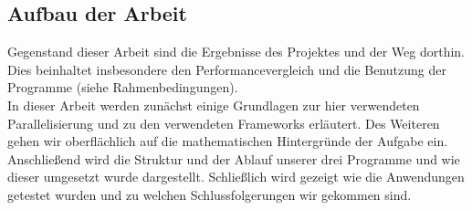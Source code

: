 \subsection{Aufbau der Arbeit}
Gegenstand dieser Arbeit sind die Ergebnisse des Projektes und der Weg dorthin. Dies beinhaltet insbesondere den Performancevergleich und die Benutzung der Programme (siehe Rahmenbedingungen).\\
In dieser Arbeit werden zunächst einige Grundlagen zur hier verwendeten Parallelisierung und zu den verwendeten Frameworks erläutert. Des Weiteren gehen wir oberflächlich auf die mathematischen Hintergründe der Aufgabe ein.\\
Anschließend wird die Struktur und der Ablauf unserer drei Programme und wie dieser umgesetzt wurde dargestellt. Schließlich wird gezeigt wie die Anwendungen getestet wurden und zu welchen Schlussfolgerungen wir gekommen sind.